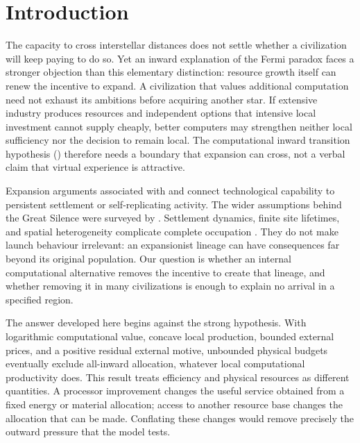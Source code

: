 \section{Introduction}
\label{sec:introduction}
The capacity to cross interstellar distances does not settle whether a
civilization will keep paying to do so. Yet an inward explanation of the
Fermi paradox faces a stronger objection than this elementary distinction:
resource growth itself can renew the incentive to expand. A civilization
that values additional computation need not exhaust its ambitions before
acquiring another star. If extensive industry produces resources and
independent options that intensive local investment cannot supply cheaply,
better computers may strengthen neither local sufficiency nor the decision
to remain local. The computational inward transition hypothesis (\CITH)
therefore needs a boundary that expansion can cross, not a verbal claim
that virtual experience is attractive.

Expansion arguments associated with \citet{Hart1975} and \citet{Tipler1980}
connect technological capability to persistent settlement or self-replicating
activity. The wider assumptions behind the Great Silence were surveyed by
\citet{Brin1983}. Settlement dynamics, finite site lifetimes, and spatial
heterogeneity complicate complete occupation \citep{NewmanSagan1981,CarrollNellenback2019}.
They do not make launch behaviour irrelevant: an expansionist lineage can
have consequences far beyond its original population. Our question is
whether an internal computational alternative removes the incentive to
create that lineage, and whether removing it in many civilizations is enough
to explain no arrival in a specified region.

The answer developed here begins against the strong hypothesis. With
logarithmic computational value, concave local production, bounded external
prices, and a positive residual external motive, unbounded physical budgets
eventually exclude all-inward allocation, whatever local computational
productivity does. This result treats efficiency and physical resources as
different quantities. A processor improvement changes the useful service
obtained from a fixed energy or material allocation; access to another
resource base changes the allocation that can be made. Conflating these
changes would remove precisely the outward pressure that the model tests.

